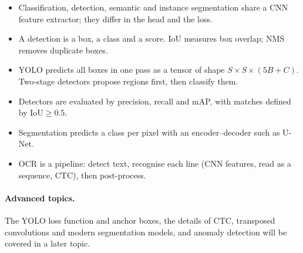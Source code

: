 \documentclass[12pt, a4paper]{article}
\begin{document}
\begin{itemize}
  \item Classification, detection, semantic and instance segmentation share
        a CNN feature extractor; they differ in the head and the loss.
  \item A detection is a box, a class and a score. IoU measures box overlap;
        NMS removes duplicate boxes.
  \item YOLO predicts all boxes in one pass as a tensor of shape
        $S \times S \times (5B + C)$. Two-stage detectors propose regions
        first, then classify them.
  \item Detectors are evaluated by precision, recall and mAP, with matches
        defined by $\text{IoU} \ge 0.5$.
  \item Segmentation predicts a class per pixel with an encoder--decoder such
        as U-Net.
  \item OCR is a pipeline: detect text, recognise each line (CNN features,
        read as a sequence, CTC), then post-process.
\end{itemize}

\paragraph{Advanced topics.}
The YOLO loss function and anchor boxes, the details of CTC, transposed
convolutions and modern segmentation models, and anomaly detection will be
covered in a later topic.
\end{document}
